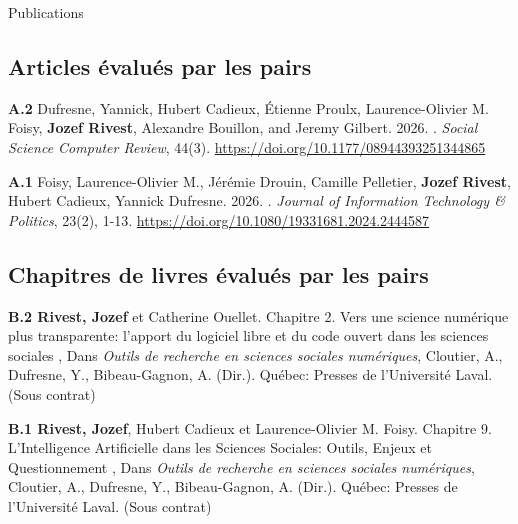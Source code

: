 \documentclass{resume} %
\begin{document}

\begin{rSection}{Publications}

	\subsection*{Articles évalués par les pairs}

	{\textbf{A.2} Dufresne, Yannick, Hubert Cadieux, Étienne Proulx,
		Laurence-Olivier M. Foisy, \textbf{Jozef Rivest}, Alexandre
		Bouillon, and Jeremy Gilbert. 2026. . \textit{Social
			Science Computer Review}, 44(3).
		\url{https://doi.org/10.1177/08944393251344865}}

	{\textbf{A.1} Foisy, Laurence-Olivier M., Jérémie Drouin, Camille
		Pelletier, \textbf{Jozef Rivest}, Hubert Cadieux, Yannick Dufresne.
		2026. . \textit{Journal of Information
			Technology \& Politics}, 23(2), 1-13.
		\url{https://doi.org/10.1080/19331681.2024.2444587}}

	\subsection*{Chapitres de livres évalués par les pairs}

	{\textbf{B.2 Rivest, Jozef} et Catherine Ouellet. \og Chapitre
		2. Vers une science numérique plus transparente:
		l'apport du logiciel libre et du code ouvert
		dans les sciences sociales \fg{}, Dans \textit{Outils
			de recherche en sciences sociales numériques},
		Cloutier, A., Dufresne, Y., Bibeau-Gagnon,
		A. (Dir.). Québec: Presses de l'Université
		Laval. (Sous contrat)} \par

	{\textbf{B.1 Rivest, Jozef}, Hubert Cadieux et Laurence-Olivier
		M. Foisy. \og Chapitre 9. L'Intelligence Artificielle dans
		les Sciences Sociales: Outils, Enjeux et Questionnement \fg{},
		Dans \textit{Outils de recherche en sciences sociales
			numériques}, Cloutier, A., Dufresne, Y., Bibeau-Gagnon, A.
		(Dir.). Québec: Presses de l'Université Laval.} (Sous
	contrat) \par


\end{rSection}
\end{document}
